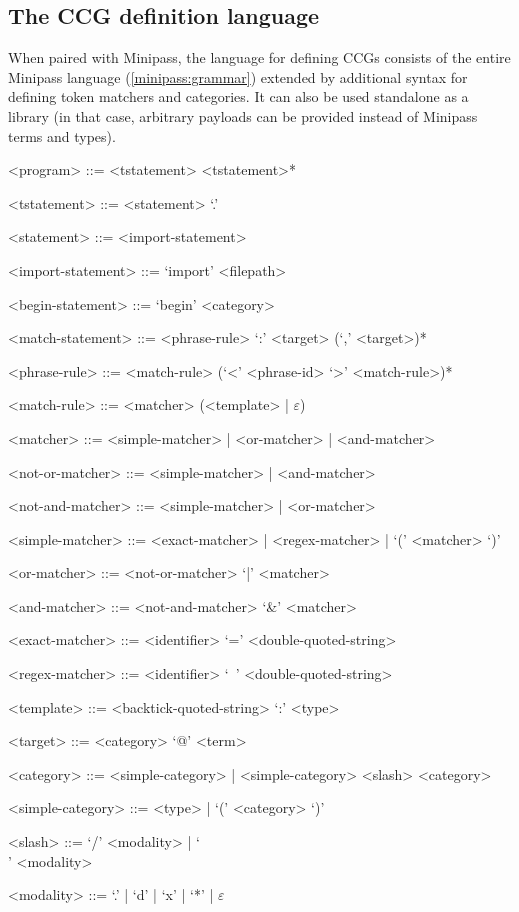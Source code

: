 \documentclass[main.tex]{subfiles}
\begin{document}
\pagebreak
\subsection{The CCG definition language}
When paired with Minipass, the language for defining CCGs consists of
the entire Minipass language
(\cref{minipass:grammar}) extended by additional syntax for defining
token matchers and categories. It can also be used standalone as a library
(in that case, arbitrary payloads can be provided instead of Minipass
terms and types).

\begin{grammar}
    <program> ::= <tstatement> <tstatement>*

    <tstatement> ::= <statement> `.'

    <statement>  ::= <import-statement>

    <import-statement> ::= `import' <filepath>

    <begin-statement>  ::= `begin' <category>

    <match-statement>  ::= <phrase-rule> `:' <target> (`,' <target>)*

    <phrase-rule> ::= <match-rule> (`<' <phrase-id> `>' <match-rule>)*

    <match-rule> ::= <matcher> (<template> | $\varepsilon$)

    <matcher> ::= <simple-matcher> | <or-matcher> | <and-matcher>

    <not-or-matcher> ::= <simple-matcher> | <and-matcher>

    <not-and-matcher> ::= <simple-matcher> | <or-matcher>

    <simple-matcher> ::= <exact-matcher> | <regex-matcher> | `(' <matcher> `)'

    <or-matcher> ::= <not-or-matcher> `|' <matcher>

    <and-matcher> ::= <not-and-matcher> `\&' <matcher>
    
    <exact-matcher> ::= <identifier> `=' <double-quoted-string>
    
    <regex-matcher> ::= <identifier> `~' <double-quoted-string>

    <template> ::= <backtick-quoted-string> `:' <type>

    <target> ::= <category> `@' <term>

    <category> ::= <simple-category> | <simple-category> <slash> <category>

    <simple-category> ::= <type> | `(' <category> `)'

    <slash> ::= `/' <modality> | `\\' <modality>

    <modality> ::= `.' | `d' | `x' | `*' | $\varepsilon$
\end{grammar}
\end{document}
